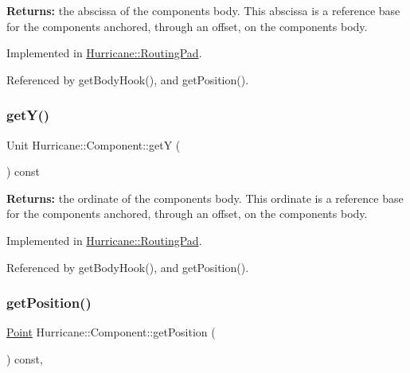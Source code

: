 {\bfseries Returns\+:} the abscissa of the component\textquotesingle{}s body. This abscissa is a reference base for the components anchored, through an offset, on the component\textquotesingle{}s body. 

Implemented in \hyperlink{classHurricane_1_1RoutingPad_a5c9c00c648bd0d24e1a8b0876ab442df}{Hurricane\+::\+Routing\+Pad}.



Referenced by get\+Body\+Hook(), and get\+Position().

\mbox{\label{classHurricane_1_1Component_a727da3f127c3a7a0a09468219f98c3e6}} 
\subsubsection{\texorpdfstring{get\+Y()}{getY()}}
{\footnotesize\ttfamily Unit Hurricane\+::\+Component\+::getY (\begin{DoxyParamCaption}{ }\end{DoxyParamCaption}) const\hspace{0.3cm}{\ttfamily [pure virtual]}}

{\bfseries Returns\+:} the ordinate of the component\textquotesingle{}s body. This ordinate is a reference base for the components anchored, through an offset, on the component\textquotesingle{}s body. 

Implemented in \hyperlink{classHurricane_1_1RoutingPad_aede4c04a7f893b1e5478b164b6eaae2d}{Hurricane\+::\+Routing\+Pad}.



Referenced by get\+Body\+Hook(), and get\+Position().

\mbox{\label{classHurricane_1_1Component_aa4e9a47c89fe701670ca34355195d519}} 
\subsubsection{\texorpdfstring{get\+Position()}{getPosition()}}
{\footnotesize\ttfamily \hyperlink{classHurricane_1_1Point}{Point} Hurricane\+::\+Component\+::get\+Position (\begin{DoxyParamCaption}{ }\end{DoxyParamCaption}) const\hspace{0.3cm}{\ttfamily [inline]}, {\ttfamily [virtual]}}

